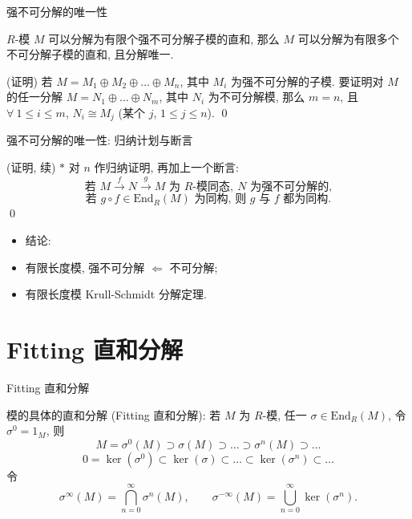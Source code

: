 
\begin{frame}{强不可分解的唯一性}

\begin{lem}[强不可分解的唯一性]
$R$-模 $M$ 可以分解为有限个强不可分解子模的直和, 那么 $M$ 可以分解为有限多个
不可分解子模的直和, 且分解唯一.
\end{lem}

\startproof[bg=yellow, fg=red](证明)
若 $M = M_1 \oplus M_2 \oplus \dots \oplus M_n$, 其中 $M_i$ 为强不可分解的子模.
要证明对 $M$ 的任一分解 $M = N_1 \oplus \dots \oplus N_m$, 其中 $N_i$ 为不可分解模,
那么 $m = n$, 且 $\forall\ 1 \leq i \leq m$,
$N_i \cong M_j$ (某个 $j$, $1 \leq j \leq n$).
\qed

\end{frame}


\begin{frame}{强不可分解的唯一性: 归纳计划与断言}

\startproof[bg=yellow, fg=red](证明, 续)
$*$ 对 $n$ 作归纳证明, 再加上一个断言:
\[
\text{若 } M \xrightarrow{\ f\ } N \xrightarrow{\ g\ } M \text{ 为 } R\text{-模同态},\
N \text{ 为强不可分解的,}
\]
\[
\text{若 } g \circ f \in \mathrm{End}_R(M) \text{ 为同构, 则 } g \text{ 与 } f \text{ 都为同构.}
\]
\qed

\pause

\begin{itemize}
\item 结论:
\item {} 有限长度模, 强不可分解 $\Longleftarrow$ 不可分解;
\item {} 有限长度模 Krull-Schmidt 分解定理.
\end{itemize}

\end{frame}


\section[Fitting]{Fitting 直和分解}


\begin{frame}{Fitting 直和分解}

模的具体的直和分解 (Fitting 直和分解):
若 $M$ 为 $R$-模, 任一 $\sigma \in \mathrm{End}_R(M)$, 令 $\sigma^0 = 1_M$, 则
\[
M = \sigma^0(M) \supset \sigma(M) \supset \dots \supset \sigma^n(M) \supset \dots
\]
\[
0 = \ker(\sigma^0) \subset \ker(\sigma) \subset \dots \subset \ker(\sigma^n) \subset \dots
\]
令
\[
\sigma^{\infty}(M) = \bigcap_{n=0}^{\infty} \sigma^n(M), \qquad
\sigma^{-\infty}(M) = \bigcup_{n=0}^{\infty} \ker(\sigma^n).
\]

\end{frame}

